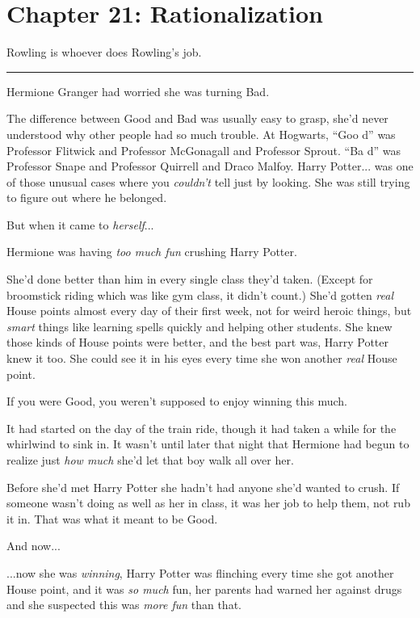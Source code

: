 \chapter{Chapter 21: Rationalization}
Rowling is whoever does Rowling's job.

\begin{center}\rule{3in}{0.4pt}\end{center}

Hermione Granger had worried she was turning Bad.

The difference between Good and Bad was usually easy to grasp, she'd never understood why other people had so much trouble. At Hogwarts, ``Goo d'' was Professor Flitwick and Professor McGonagall and Professor Sprout. ``Ba d'' was Professor Snape and Professor Quirrell and Draco Malfoy. Harry Potter... was one of those unusual cases where you \emph{couldn't} tell just by looking. She was still trying to figure out where he belonged.

But when it came to \emph{herself}...

Hermione was having \emph{too much fun} crushing Harry Potter.

She'd done better than him in every single class they'd taken. (Except for broomstick riding which was like gym class, it didn't count.) She'd gotten \emph{real} House points almost every day of their first week, not for weird heroic things, but \emph{smart} things like learning spells quickly and helping other students. She knew those kinds of House points were better, and the best part was, Harry Potter knew it too. She could see it in his eyes every time she won another \emph{real} House point.

If you were Good, you weren't supposed to enjoy winning this much.

It had started on the day of the train ride, though it had taken a while for the whirlwind to sink in. It wasn't until later that night that Hermione had begun to realize just \emph{how much} she'd let that boy walk all over her.

Before she'd met Harry Potter she hadn't had anyone she'd wanted to crush. If someone wasn't doing as well as her in class, it was her job to help them, not rub it in. That was what it meant to be Good.

And now...

...now she was \emph{winning}, Harry Potter was flinching every time she got another House point, and it was \emph{so much} fun, her parents had warned her against drugs and she suspected this was \emph{more fun} than that.

